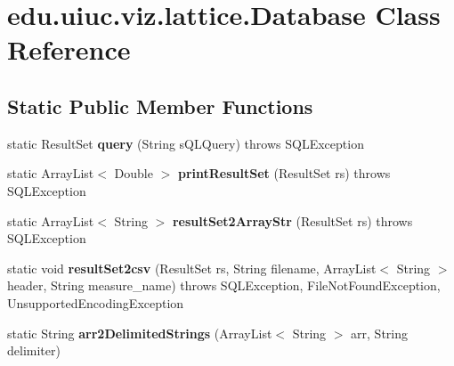 \hypertarget{classedu_1_1uiuc_1_1viz_1_1lattice_1_1_database}{}\section{edu.\+uiuc.\+viz.\+lattice.\+Database Class Reference}
\label{classedu_1_1uiuc_1_1viz_1_1lattice_1_1_database}
\subsection*{Static Public Member Functions}
\begin{DoxyCompactItemize}
\item 
\mbox{\label{classedu_1_1uiuc_1_1viz_1_1lattice_1_1_database_ab547c694ede275d726dac8672dd27edb}} 
static Result\+Set {\bfseries query} (String s\+Q\+L\+Query)  throws S\+Q\+L\+Exception 
\item 
\mbox{\label{classedu_1_1uiuc_1_1viz_1_1lattice_1_1_database_af9a49bec7eab55279c595bb3989a439b}} 
static Array\+List$<$ Double $>$ {\bfseries print\+Result\+Set} (Result\+Set rs)  throws S\+Q\+L\+Exception 
\item 
\mbox{\label{classedu_1_1uiuc_1_1viz_1_1lattice_1_1_database_a89bd76cd775c2bdf5a8a8701b32eff8c}} 
static Array\+List$<$ String $>$ {\bfseries result\+Set2\+Array\+Str} (Result\+Set rs)  throws S\+Q\+L\+Exception 
\item 
\mbox{\label{classedu_1_1uiuc_1_1viz_1_1lattice_1_1_database_a5202135211d571ce60077240ad0a2997}} 
static void {\bfseries result\+Set2csv} (Result\+Set rs, String filename, Array\+List$<$ String $>$ header, String measure\+\_\+name)  throws S\+Q\+L\+Exception, File\+Not\+Found\+Exception, Unsupported\+Encoding\+Exception 
\item 
\mbox{\label{classedu_1_1uiuc_1_1viz_1_1lattice_1_1_database_ae3af32718158ce25501134ff753ade51}} 
static String {\bfseries arr2\+Delimited\+Strings} (Array\+List$<$ String $>$ arr, String delimiter)
\item 
\mbox{\label{classedu_1_1uiuc_1_1viz_1_1lattice_1_1_database_a1c068934b872f09fa921a39c1094e39d}} 

\end{DoxyCompactItemize}
